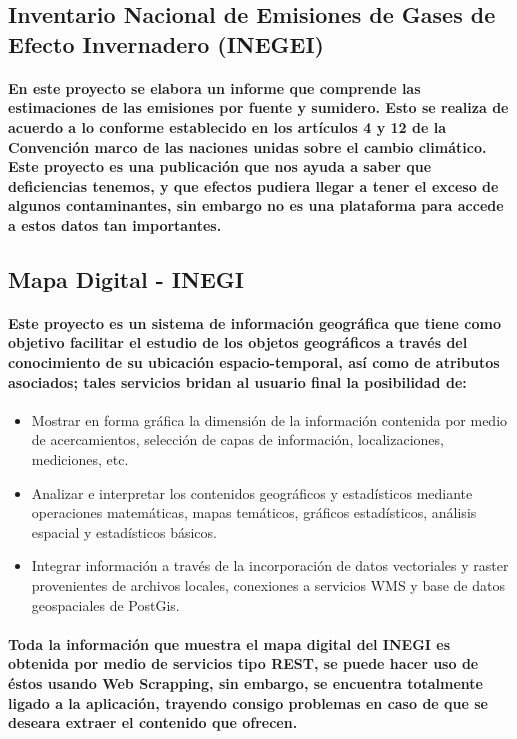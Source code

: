   \subsection {Inventario Nacional de Emisiones de Gases de Efecto Invernadero (INEGEI)}
    \paragraph {En este proyecto se elabora un informe que comprende las estimaciones de las emisiones por fuente y sumidero. Esto se realiza de acuerdo a lo conforme establecido en los artículos 4 y 12 de la Convención marco de las naciones unidas sobre el cambio climático. Este proyecto es una publicación que nos ayuda a saber que deficiencias tenemos, y que efectos pudiera llegar a tener el exceso de algunos contaminantes, sin embargo no es una plataforma para accede a estos datos tan importantes.}

  \subsection {Mapa Digital -  INEGI}
    \paragraph {Este proyecto es un sistema de información geográfica que tiene como objetivo facilitar el estudio de los objetos geográficos a través del conocimiento de su ubicación espacio-temporal, así como de atributos asociados;  tales servicios bridan al usuario final la posibilidad de:}

  \begin{itemize}
    \item {Mostrar en forma gráfica la dimensión de la información contenida por medio de acercamientos, selección de capas de información, localizaciones, mediciones, etc.}
    \item {Analizar e interpretar los contenidos geográficos y estadísticos mediante operaciones matemáticas, mapas temáticos, gráficos estadísticos, análisis espacial y estadísticos básicos.}
    \item {Integrar información a través de la incorporación de datos vectoriales y raster provenientes de archivos locales, conexiones a servicios WMS y base de datos geospaciales de PostGis.}
  \end{itemize}

  \paragraph{Toda la información que muestra el mapa digital del INEGI es obtenida por medio de servicios tipo REST, se puede hacer uso de éstos usando Web Scrapping, sin embargo, se encuentra totalmente ligado a la aplicación, trayendo consigo problemas en caso de que se deseara extraer el contenido que ofrecen.}

